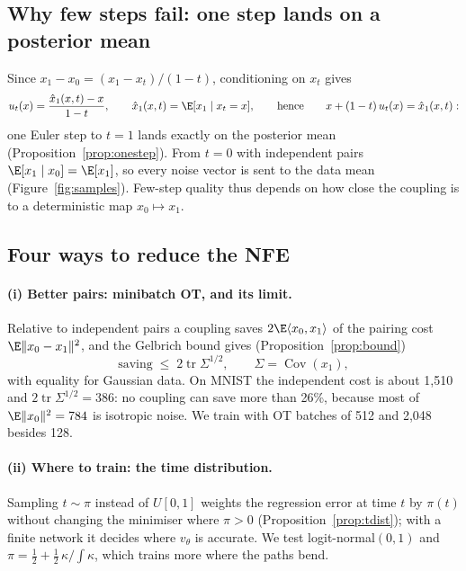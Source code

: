 \subsection{Why few steps fail: one step lands on a posterior mean}\label{sec:onestep}
Since $x_1-x_0=(x_1-x_t)/(1-t)$, conditioning on $x_t$ gives
\begin{equation}\label{eq:postmean}
u_t(x)=\frac{\hat x_1(x,t)-x}{1-t},\qquad \hat x_1(x,t)=\E[x_1\mid x_t=x],
\qquad\text{hence}\qquad x+(1-t)\,u_t(x)=\hat x_1(x,t):
\end{equation}
one Euler step to $t=1$ lands exactly on the posterior mean (Proposition~\ref{prop:onestep}). From $t=0$ with independent pairs $\E[x_1\mid x_0]=\E[x_1]$, so every noise vector is sent to the data mean (Figure~\ref{fig:samples}). Few-step quality thus depends on how close the coupling is to a deterministic map $x_0\mapsto x_1$.

\subsection{Four ways to reduce the NFE}\label{sec:levers}
\paragraph{(i) Better pairs: minibatch OT, and its limit.} Relative to independent pairs a coupling saves $2\E\langle x_0,x_1\rangle$ of the pairing cost $\E\|x_0-x_1\|^2$, and the Gelbrich bound \citep{gelbrich1990} gives (Proposition~\ref{prop:bound})
\begin{equation}\label{eq:bound}
\text{saving}\;\le\;2\operatorname{tr}\Sigma^{1/2},\qquad \Sigma=\operatorname{Cov}(x_1),
\end{equation}
with equality for Gaussian data. On MNIST the independent cost is about 1,510 and $2\operatorname{tr}\Sigma^{1/2}=386$: no coupling can save more than 26\%, because most of $\E\|x_0\|^2=784$ is isotropic noise. We train with OT batches of 512 and 2,048 besides 128.
\paragraph{(ii) Where to train: the time distribution.} Sampling $t\sim\pi$ instead of $U[0,1]$ weights the regression error at time $t$ by $\pi(t)$ without changing the minimiser where $\pi>0$ (Proposition~\ref{prop:tdist}); with a finite network it decides where $v_\theta$ is accurate. We test logit-normal$(0,1)$ \citep{esser2024sd3} and $\pi=\tfrac12+\tfrac12\,\kappa/\!\int\kappa$, which trains more where the paths bend.
